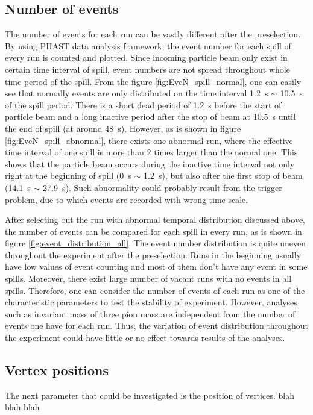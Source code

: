 \subsection{Number of events}
The number of events for each run can be vastly different after the preselection. By using PHAST data analysis framework, the event number for each spill of every run is counted and plotted. Since incoming particle beam only exist in certain time interval of spill, event numbers are not spread throughout whole time period of the spill. From the figure \ref{fig:EveN_spill_normal}, one can easily see that normally events are only distributed on the time interval \SI{1.2}{\second} $\sim$ \SI{10.5}{\second} of the spill period. There is a short dead period of \SI{1.2}{\second} before the start of particle beam and a long inactive period after the stop of beam at \SI{10.5}{\second} until the end of spill (at around \SI{48}{\second}). However, as is shown in figure \ref{fig:EveN_spill_abnormal}, there exists one abnormal run, where the effective time interval of one spill is more than 2 times larger than the normal one. This shows that the particle beam occurs during the inactive time interval not only right at the beginning of spill (\SI{0}{\second} $\sim$ \SI{1.2}{\second}), but also after the first stop of beam (\SI{14.1}{\second} $\sim$ \SI{27.9}{\second}). Such abnormality could probably result from the trigger problem, due to which events are recorded with wrong time scale.

After selecting out the run with abnormal temporal distribution discussed above, the number of events can be compared for each spill in every run, as is shown in figure \ref{fig:event_distribution_all}. The event number distribution is quite uneven throughout the experiment after the preselection. Runs in the beginning usually have low values of event counting and most of them don't have any event in some spills. Moreover, there exist large number of vacant runs with no events in all spills. Therefore, one can consider the number of events of each run as one of the characteristic parameters to test the stability of experiment. However, analyses such as invariant mass of three pion mass are independent from the number of events one have for each run. Thus, the variation of event distribution throughout the experiment could have little or no effect towards results of the analyses.

\subsection{Vertex positions}
The next parameter that could be investigated is the position of vertices. blah blah blah
